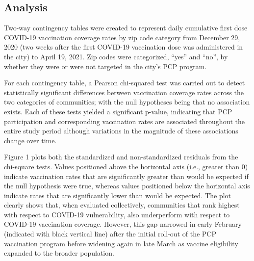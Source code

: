 \documentclass[
]{article}
\begin{document}
\hypertarget{analysis}{%
\subsection{Analysis}\label{analysis}}

Two-way contingency tables were created to represent daily cumulative first dose COVID-19 vaccination coverage rates by zip code category from December 29, 2020 (two weeks after the first COVID-19 vaccination dose was administered in the city) to April 19, 2021. Zip codes were categorized, ``yes'' and ``no'', by whether they were or were not targeted in the city's PCP program.

For each contingency table, a Pearson chi-squared test was carried out to detect statistically significant differences between vaccination coverage rates across the two categories of communities; with the null hypotheses being that no association exists. Each of these tests yielded a significant p-value, indicating that PCP participation and corresponding vaccination rates are associated throughout the entire study period although variations in the magnitude of these associations change over time.

Figure 1 plots both the standardized and non-standardized residuals from the chi-square tests. Values positioned above the horizontal axis (i.e., greater than 0) indicate vaccination rates that are significantly greater than would be expected if the null hypothesis were true, whereas values positioned below the horizontal axis indicate rates that are significantly lower than would be expected. The plot clearly shows that, when evaluated collectively, communities that rank highest with respect to COVID-19 vulnerability, also underperform with respect to COVID-19 vaccination coverage. However, this gap narrowed in early February (indicated with black vertical line) after the initial roll-out of the PCP vaccination program before widening again in late March as vaccine eligibility expanded to the broader population.
\end{document}
